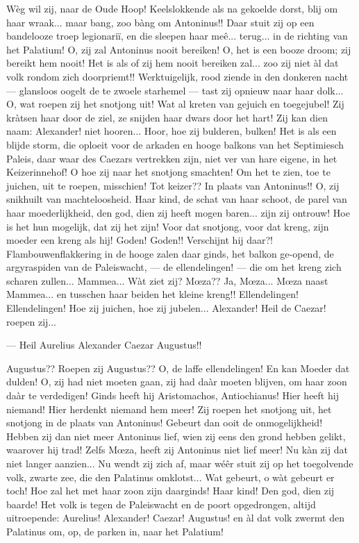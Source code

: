 \documentclass[a4paper, 12pt, oneside, dutch]{article}
\begin{document}
Wèg wil zij, naar de Oude Hoop! Keelslokkende als na gekoelde dorst, blij om haar wraak... maar bang, zoo bàng om Antoninus!! Daar stuit zij op een bandelooze troep legionariï, en die sleepen haar meê... terug... in de richting van het Palatium! O, zij zal Antoninus nooit bereiken! O, het is een booze droom; zij bereikt hem nooit! Het is als of zij hem nooit bereiken zal... zoo zij niet àl dat volk rondom zich doorpriemt!! Werktuigelijk, rood ziende in den donkeren nacht --- glansloos oogelt de te zwoele starhemel --- tast zij opnieuw naar haar dolk... O, wat roepen zij het snotjong uit! Wat al kreten van gejuich en toegejubel! Zij kràtsen haar door de ziel, ze snijden haar dwars door het hart! Zij kan dien naam: Alexander! niet hooren... Hoor, hoe zij bulderen, bulken! Het is als een blijde storm, die oploeit voor de arkaden en hooge balkons van het Septimiesch Paleis, daar waar des Caezars vertrekken zijn, niet ver van hare eigene, in het Keizerinnehof! O hoe zij naar het snotjong smachten! Om het te zien, toe te juichen, uit te roepen, misschien! Tot keizer?? In plaats van Antoninus!! O, zij snikhuilt van machteloosheid. Haar kind, de schat van haar schoot, de parel van haar moederlijkheid, den god, dien zij heeft mogen baren... zijn zij ontrouw! Hoe is het hun mogelijk, dat zij het zijn! Voor dat snotjong, voor dat kreng, zijn moeder een kreng als hij! Goden! Goden!! Verschijnt hij daar?! Flambouwenflakkering in de hooge zalen daar ginds, het balkon ge-opend, de argyraspiden van de Paleiswacht, --- de ellendelingen! --- die om het kreng zich scharen zullen... Mammea... Wàt ziet zij? Mœza?? Ja, Mœza... Mœza naast Mammea... en tusschen haar beiden het kleine kreng!! Ellendelingen! Ellendelingen! Hoe zij juichen, hoe zij jubelen... Alexander! Heil de Caezar! roepen zij...

--- Heil Aurelius Alexander Caezar Augustus!!

Augustus?? Roepen zij Augustus?? O, de laffe ellendelingen! En kan Moeder dat dulden! O, zij had niet moeten gaan, zij had daàr moeten blijven, om haar zoon daàr te verdedigen! Ginds heeft hij Aristomachos, Antiochianus! Hier heeft hij niemand! Hier herdenkt niemand hem meer! Zij roepen het snotjong uit, het snotjong in de plaats van Antoninus! Gebeurt dan ooit de onmogelijkheid! Hebben zij dan niet meer Antoninus lief, wien zij eens den grond hebben gelikt, waarover hij trad! Zelfs Mœza, heeft zij Antoninus niet lief meer! Nu kàn zij dat niet langer aanzien... Nu wendt zij zich af, maar wéêr stuit zij op het toegolvende volk, zwarte zee, die den Palatinus omklotst... Wat gebeurt, o wàt gebeurt er toch! Hoe zal het met haar zoon zijn daarginds! Haar kind! Den god, dien zij baarde! Het volk is tegen de Paleiswacht en de poort opgedrongen, altijd uitroepende: Aurelius! Alexander! Caezar! Augustus! en àl dat volk zwermt den Palatinus om, op, de parken in, naar het Palatium!
\end{document}
